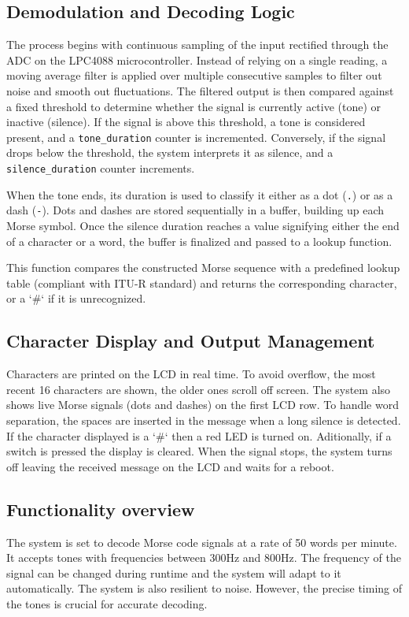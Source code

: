 \documentclass{article}
\begin{document}
\subsection{Demodulation and Decoding Logic} 
The process begins with continuous sampling of the input rectified through the ADC on the 
LPC4088 microcontroller. Instead of relying on a single reading,
a moving average filter is applied over multiple consecutive samples to filter out noise and smooth out
fluctuations.
 The filtered output is then compared against a fixed threshold to determine 
whether the signal is currently active (tone) or inactive (silence).
 If the signal is above this threshold, a tone is considered present, and a \texttt{tone\_duration}
  counter is incremented. Conversely, if the signal drops below the threshold, the system interprets 
  it as silence, and a \texttt{silence\_duration} counter increments. 

When the tone ends, its duration is used to classify it either as a dot (\texttt{.}) 
or as a dash (\texttt{-}). Dots and dashes are stored sequentially in a buffer, 
building up each Morse symbol. Once the silence duration reaches a value signifying 
either the end of a character or a word, the buffer is finalized and passed to a lookup function.

This function compares the constructed Morse sequence with a predefined lookup table
(compliant with ITU-R standard) and returns the corresponding character, or a `\#` if it is unrecognized. 

\subsection{Character Display and Output Management}
Characters are printed on the LCD in real time. To avoid overflow, 
the most recent 16 characters are shown, the older ones scroll off screen. 
The system also shows live Morse signals (dots and dashes) on the first LCD row.
To handle word separation, the spaces are inserted in the message when a long silence is detected. 
If the character displayed is a `\#` then a red LED is turned on. Aditionally, if a switch is pressed 
the display is cleared. When the signal stops, the system turns off leaving the received message on
the LCD and waits for a reboot.

\subsection{Functionality overview}
The system is set to decode Morse code signals at a rate of 50 words per minute. It accepts tones with
frequencies between 300Hz and 800Hz. The frequency of the signal can be changed during runtime
and the system will adapt to it automatically. The system is also resilient to noise. However,
the precise timing of the tones is crucial for accurate decoding.
\end{document}

